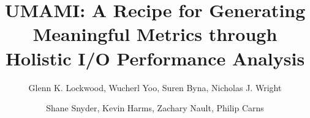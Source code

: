 \documentclass[sigconf,10pt]{acmart}
\begin{document}
\title{UMAMI: A Recipe for Generating Meaningful Metrics through Holistic I/O Performance Analysis}

\author{Glenn K. Lockwood, Wucherl Yoo, Suren Byna, Nicholas J. Wright}

\author{Shane Snyder, Kevin Harms, Zachary Nault, Philip Carns}

\renewcommand{\shortauthors}{G. Lockwood et al.}

\renewcommand{\shorttitle}{UMAMI: A Recipe for Generating Meaningful I/O Metrics}



\maketitle










\end{document}
